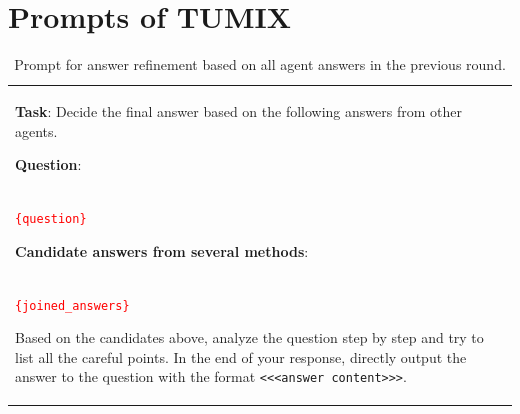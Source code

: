 \newpage
\section{Prompts of TUMIX}
\label{appendix section: Prompts of TUMIX}

\begin{table}[h!]
  \caption{Prompt for answer refinement based on all agent answers in the previous round.}
  \label{tab:final-answer-prompt}
  \centering
  \small %
  \renewcommand{\arraystretch}{1.2} %
  
  \begin{tabularx}{\linewidth}{X} %
    \toprule
    \textbf{Task}: Decide the final answer based on the following answers from other agents.
    \vspace{0.5em} %

    \textbf{Question}: \\
    \textcolor{red}{\texttt{\{question\}}}
    \vspace{0.5em}

    \textbf{Candidate answers from several methods}: \\
    \textcolor{red}{\texttt{\{joined\_answers\}}}
    \vspace{0.5em}
    
    Based on the candidates above, analyze the question step by step and try to list all the careful points. In the end of your response, directly output the answer to the question with the format \texttt{<<<answer content>>>}. \\
    \bottomrule
  \end{tabularx}
\end{table}

